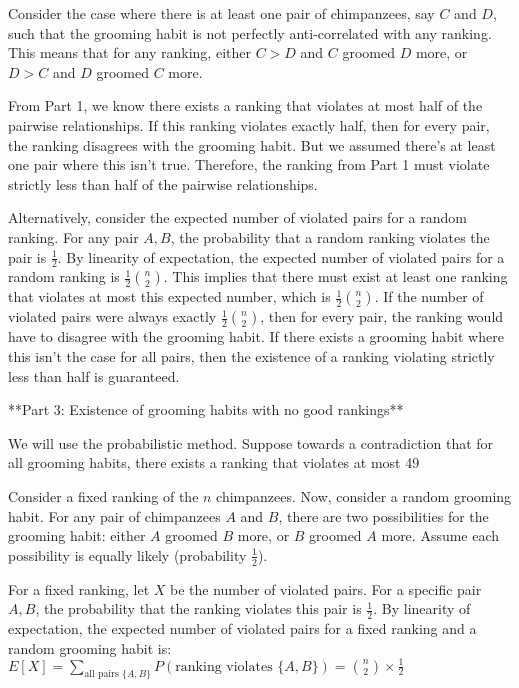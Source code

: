 \begin{enumerate}
\begin{shaded}
Consider the case where there is at least one pair of chimpanzees, say $C$ and $D$, such that the grooming habit is not perfectly anti-correlated with any ranking. This means that for any ranking, either $C > D$ and $C$ groomed $D$ more, or $D > C$ and $D$ groomed $C$ more.

From Part 1, we know there exists a ranking that violates at most half of the pairwise relationships. If this ranking violates exactly half, then for every pair, the ranking disagrees with the grooming habit. But we assumed there's at least one pair where this isn't true. Therefore, the ranking from Part 1 must violate strictly less than half of the pairwise relationships.

Alternatively, consider the expected number of violated pairs for a random ranking. For any pair $A, B$, the probability that a random ranking violates the pair is $\frac{1}{2}$. By linearity of expectation, the expected number of violated pairs for a random ranking is $\frac{1}{2} \binom{n}{2}$. This implies that there must exist at least one ranking that violates at most this expected number, which is $\frac{1}{2} \binom{n}{2}$. If the number of violated pairs were always exactly $\frac{1}{2} \binom{n}{2}$, then for every pair, the ranking would have to disagree with the grooming habit. If there exists a grooming habit where this isn't the case for all pairs, then the existence of a ranking violating strictly less than half is guaranteed.

**Part 3: Existence of grooming habits with no good rankings**

We will use the probabilistic method. Suppose towards a contradiction that for all grooming habits, there exists a ranking that violates at most 49%

Consider a fixed ranking of the $n$ chimpanzees. Now, consider a random grooming habit. For any pair of chimpanzees $A$ and $B$, there are two possibilities for the grooming habit: either $A$ groomed $B$ more, or $B$ groomed $A$ more. Assume each possibility is equally likely (probability $\frac{1}{2}$).

For a fixed ranking, let $X$ be the number of violated pairs. For a specific pair $A, B$, the probability that the ranking violates this pair is $\frac{1}{2}$. By linearity of expectation, the expected number of violated pairs for a fixed ranking and a random grooming habit is:
$E[X] = \sum_{\text{all pairs } \{A, B\}} P(\text{ranking violates } \{A, B\}) = \binom{n}{2} \times \frac{1}{2}$


\end{shaded}
\end{enumerate}
